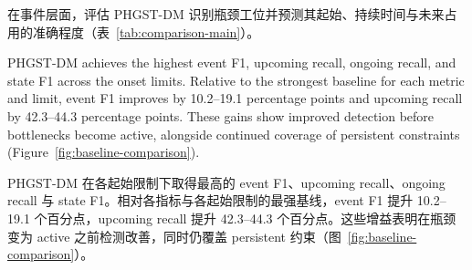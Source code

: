 \documentclass[a4paper,fleqn]{cas-dc}
\newcommand{\zhpara}[1]{%
  \par\begingroup\small\color{black!72}\noindent #1\par\endgroup}
\begin{document}
\zhpara{在事件层面，评估 PHGST-DM 识别瓶颈工位并预测其起始、持续时间与未来占用的准确程度（表~\ref{tab:comparison-main}）。}


PHGST-DM achieves the highest event F1, upcoming recall, ongoing recall, and state F1 across the onset limits. Relative to the strongest baseline for each metric and limit, event F1 improves by 10.2--19.1 percentage points and upcoming recall by 42.3--44.3 percentage points. These gains show improved detection before bottlenecks become active, alongside continued coverage of persistent constraints (Figure~\ref{fig:baseline-comparison}).

\zhpara{PHGST-DM 在各起始限制下取得最高的 event F1、upcoming recall、ongoing recall 与 state F1。相对各指标与各起始限制的最强基线，event F1 提升 10.2--19.1 个百分点，upcoming recall 提升 42.3--44.3 个百分点。这些增益表明在瓶颈变为 active 之前检测改善，同时仍覆盖 persistent 约束（图~\ref{fig:baseline-comparison}）。}
\end{document}
